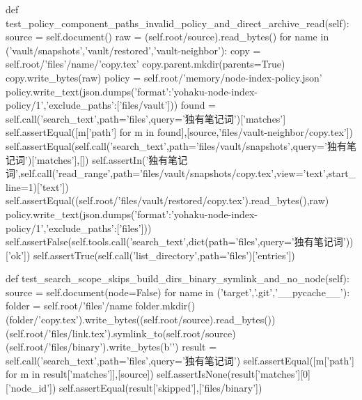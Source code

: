     def test_policy_component_paths_invalid_policy_and_direct_archive_read(self):
        source = self.document()
        raw = (self.root/source).read_bytes()
        for name in ('vault/snapshots','vault/restored','vault-neighbor'):
            copy = self.root/'files'/name/'copy.tex'
            copy.parent.mkdir(parents=True)
            copy.write_bytes(raw)
        policy = self.root/'memory/node-index-policy.json'
        policy.write_text(json.dumps({'format':'yohaku-node-index-policy/1','exclude_paths':['files/vault']}))
        found = self.call('search_text',path='files',query='独有笔记词')['matches']
        self.assertEqual([m['path'] for m in found],[source,'files/vault-neighbor/copy.tex'])
        self.assertEqual(self.call('search_text',path='files/vault/snapshots',query='独有笔记词')['matches'],[])
        self.assertIn('独有笔记词',self.call('read_range',path='files/vault/snapshots/copy.tex',view='text',start_line=1)['text'])
        self.assertEqual((self.root/'files/vault/restored/copy.tex').read_bytes(),raw)
        policy.write_text(json.dumps({'format':'yohaku-node-index-policy/1','exclude_paths':['files']}))
        self.assertFalse(self.tools.call('search_text',dict(path='files',query='独有笔记词'))['ok'])
        self.assertTrue(self.call('list_directory',path='files')['entries'])

    def test_search_scope_skips_build_dirs_binary_symlink_and_no_node(self):
        source = self.document(node=False)
        for name in ('target','.git','__pycache__'):
            folder = self.root/'files'/name
            folder.mkdir()
            (folder/'copy.tex').write_bytes((self.root/source).read_bytes())
        (self.root/'files/link.tex').symlink_to(self.root/source)
        (self.root/'files/binary').write_bytes(b'\xff\xfe')
        result = self.call('search_text',path='files',query='独有笔记词')
        self.assertEqual([m['path'] for m in result['matches']],[source])
        self.assertIsNone(result['matches'][0]['node_id'])
        self.assertEqual(result['skipped'],['files/binary'])

